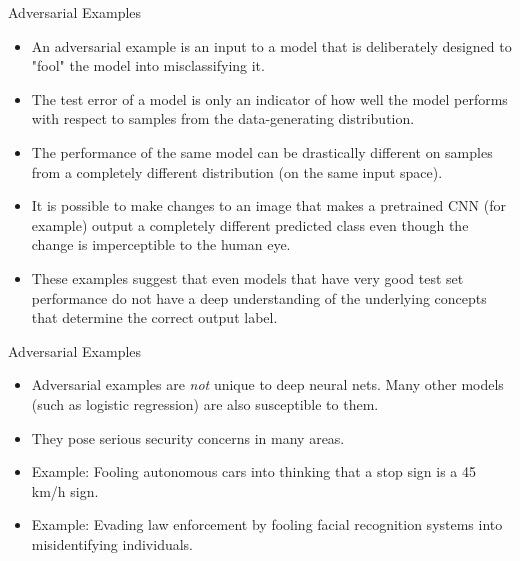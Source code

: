 \documentclass[11pt,compress,t,notes=noshow]{beamer}
\begin{document}
 \begin{frame} {Adversarial Examples}
   \begin{itemize}
     \item An adversarial example is an input to a model that is deliberately designed to "fool" the model into misclassifying it.
     \item The test error of a model is only an indicator of how well the model performs with respect to samples from the data-generating distribution.
     \item The performance of the same model can be drastically different on samples from a completely different distribution (on the same input space).
      \item It is possible to make changes to an image that makes a pretrained CNN (for example) output a completely different predicted class even though the change is imperceptible to the human eye.
     \item These examples suggest that even models that have very good test set performance do not have a deep understanding of the underlying concepts that determine the correct output label.
     \end{itemize}
    \end{frame}
    
  \begin{frame} {Adversarial Examples}
    \begin{itemize}
      \item Adversarial examples are \textit{not} unique to deep neural nets. Many other models (such as logistic regression) are also susceptible to them.
      \item They pose serious security concerns in many areas.
      \item Example: Fooling autonomous cars into thinking that a stop sign is a 45 km/h sign.
      \item Example: Evading law enforcement by fooling facial recognition systems into misidentifying individuals.
   \end{itemize}
 \end{frame}
 
\end{document}
